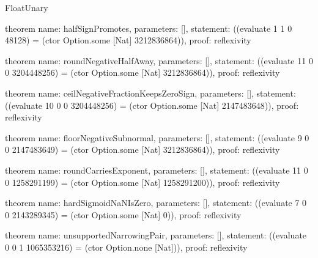 \begin{lexlean}{FloatUnary}
\begin{semanticmodule}
theorem{
  name: halfSignPromotes,
  parameters: [],
  statement: ((evaluate 1 1 0 48128) = (ctor Option.some [Nat] 3212836864)),
  proof: reflexivity{}
}

theorem{
  name: roundNegativeHalfAway,
  parameters: [],
  statement: ((evaluate 11 0 0 3204448256) = (ctor Option.some [Nat] 3212836864)),
  proof: reflexivity{}
}

theorem{
  name: ceilNegativeFractionKeepsZeroSign,
  parameters: [],
  statement: ((evaluate 10 0 0 3204448256) = (ctor Option.some [Nat] 2147483648)),
  proof: reflexivity{}
}

theorem{
  name: floorNegativeSubnormal,
  parameters: [],
  statement: ((evaluate 9 0 0 2147483649) = (ctor Option.some [Nat] 3212836864)),
  proof: reflexivity{}
}

theorem{
  name: roundCarriesExponent,
  parameters: [],
  statement: ((evaluate 11 0 0 1258291199) = (ctor Option.some [Nat] 1258291200)),
  proof: reflexivity{}
}

theorem{
  name: hardSigmoidNaNIsZero,
  parameters: [],
  statement: ((evaluate 7 0 0 2143289345) = (ctor Option.some [Nat] 0)),
  proof: reflexivity{}
}

theorem{
  name: unsupportedNarrowingPair,
  parameters: [],
  statement: ((evaluate 0 0 1 1065353216) = (ctor Option.none [Nat])),
  proof: reflexivity{}
}
\end{semanticmodule}
\end{lexlean}

